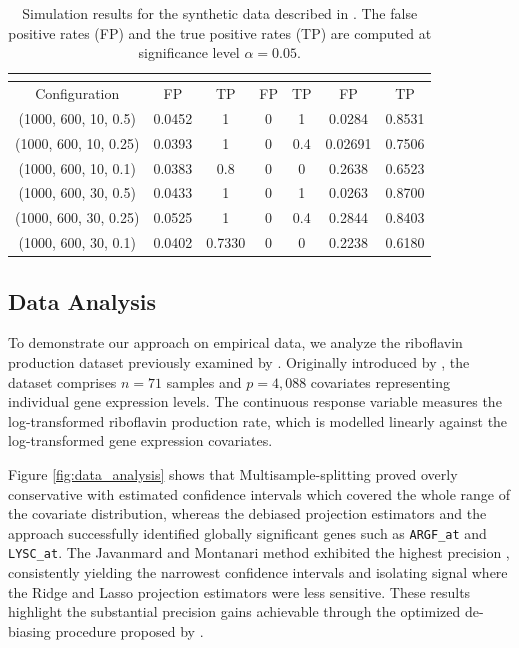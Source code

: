\documentclass{article}
\begin{document}
\begin{table}[ht]
\centering
\begin{tabular}{|c|c|c|c|c|c|c|}
 \hline &  &  &  \\ \hline 
Configuration & FP & TP & FP & TP & FP & TP \\ \hline
(1000, 600, 10, 0.5) & 0.0452 & 1 & 0 & 1 & 0.0284 & 0.8531 \\
(1000, 600, 10, 0.25) & 0.0393 & 1 & 0 & 0.4 & 0.02691 & 0.7506 \\
(1000, 600, 10, 0.1) & 0.0383 & 0.8 & 0 & 0 & 0.2638 & 0.6523 \\
(1000, 600, 30, 0.5) & 0.0433 & 1 & 0 & 1 & 0.0263 & 0.8700 \\
(1000, 600, 30, 0.25) & 0.0525 & 1 & 0 & 0.4 & 0.2844 & 0.8403 \\
(1000, 600, 30, 0.1) & 0.0402 & 0.7330 & 0 & 0 & 0.2238 & 0.6180 \\
\hline
\end{tabular}
\caption{Simulation results for the synthetic data described in \citep{javanmard14a}. The false positive rates (FP) and the true positive rates (TP) are computed at significance level $\alpha = 0.05$.}
\label{tab:tab4}
\end{table}


\subsection{Data Analysis}
\label{sec:3.2}
To demonstrate our approach on empirical data, we analyze the riboflavin production dataset previously examined by \citet{javanmard14a}. Originally introduced by \citet{buhlmann2014high}, the dataset comprises $n=71$ samples and $p=4,088$ covariates representing individual gene expression levels. The continuous response variable measures the log-transformed riboflavin production rate, which is modelled linearly against the log-transformed gene expression covariates.

Figure \ref{fig:data_analysis} shows that Multisample-splitting proved overly conservative with estimated confidence intervals which covered the whole range of the covariate distribution, whereas the debiased projection estimators and the \citet{javanmard14a} approach successfully identified globally significant genes such as \texttt{ARGF\_at} and \texttt{LYSC\_at}. The Javanmard and Montanari method exhibited the highest precision , consistently yielding the narrowest confidence intervals and isolating signal where the Ridge and Lasso projection estimators were less sensitive. These results highlight the substantial precision gains achievable through the optimized de-biasing procedure proposed by \citet{javanmard14a}.
\end{document}
